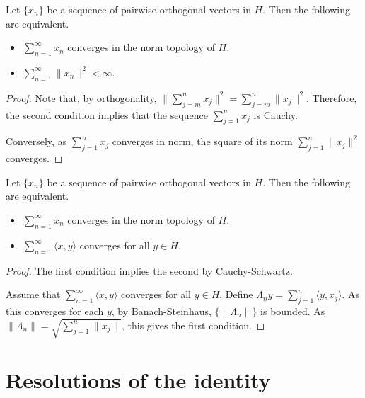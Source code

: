 \begin{lemma}[12.6, part 1]
 Let $\{x_n\}$ be a sequence of pairwise orthogonal vectors in $H$.
 Then the following are equivalent.
 \begin{itemize}
  \item $\sum_{n=1}^\infty x_n$ converges in the norm topology of $H$.
  \item $\sum_{n=1}^\infty \|x_n\|^2 < \infty$.
 \end{itemize}
\end{lemma}
\begin{proof}
 Note that, by orthogonality,
 $\|\sum_{j=m}^n x_j\|^2 = \sum_{j=m}^n \|x_j\|^2$.
 Therefore, the second condition implies that the sequence $\sum_{j=1}^n x_j$ is Cauchy.

 Conversely, as $\sum_{j=1}^n x_j$ converges in norm, the square of its norm $\sum_{j=1}^n \|x_j\|^2$ converges.

\end{proof}

\begin{lemma}[12.6, part 2]
 Let $\{x_n\}$ be a sequence of pairwise orthogonal vectors in $H$.
 Then the following are equivalent.
 \begin{itemize}
  \item $\sum_{n=1}^\infty x_n$ converges in the norm topology of $H$.
  \item $\sum_{n=1}^\infty \langle x, y\rangle$ converges for all $y \in H$.
 \end{itemize}
\end{lemma}
\begin{proof}
 The first condition implies the second by Cauchy-Schwartz.

 Assume that
 $\sum_{n=1}^\infty \langle x, y\rangle$ converges for all $y \in H$.
 Define $\Lambda_n y = \sum_{j=1}^n \langle y, x_j\rangle$.
 As this converges for each $y$, by Banach-Steinhaus, $\{\|\Lambda_n\|\}$ is bounded.
 As $\|\Lambda_n\| = \sqrt{\sum_{j=1}^n \|x_j\|}$, this gives the first condition.
\end{proof}

\section{Resolutions of the identity}


